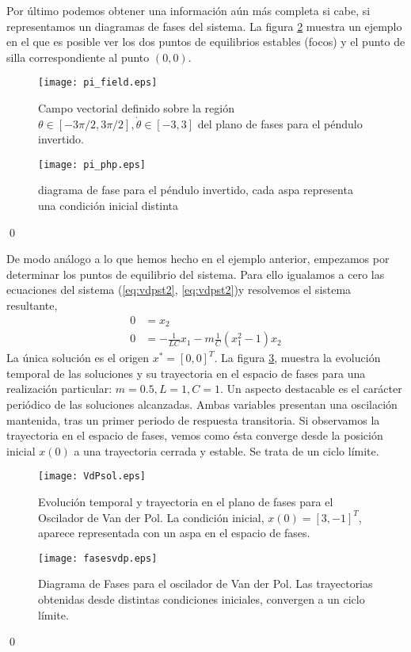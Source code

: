 \begin{example}
Por último podemos obtener una información aún más completa si cabe, si representamos un diagramas de fases del sistema.  La figura \ref{fig:piphp} muestra un ejemplo en el que es posible ver los dos puntos de equilibrios estables (focos) y el punto de silla correspondiente al punto $(0,0)$. 

 
\begin{figure}
\centering
\texttt{[image: pi\_field.eps]}
\caption{Campo vectorial definido sobre la región  $\theta \in [-3\pi/2,3\pi/2], \dot \theta \in [-3,3]$ del plano de fases para el péndulo invertido. } \label{fig:pifield}
\end{figure}

 \begin{figure}
\centering
\texttt{[image: pi\_php.eps]}
\caption{diagrama de fase para el péndulo invertido, cada aspa representa una condición inicial distinta} \label{fig:piphp}
\end{figure}
\qed
\end{example}

\begin{example} De modo análogo a lo que hemos hecho en el ejemplo anterior, empezamos por determinar los puntos de equilibrio del sistema. Para ello igualamos a cero las ecuaciones del sistema (\ref{eq:vdpst2}, \ref{eq:vdpst2})y resolvemos el sistema resultante,
\begin{align}
0 &= x_2\\
0 &= -\frac{1}{LC}x_1 - m\frac{1}{C}(x_1^2-1)x_2 
\end{align}
La única solución es el origen $x^*=[0,0]^T$. La figura \ref{fig:vandesol}, muestra la evolución temporal de las soluciones y su trayectoria en el espacio de fases para una realización particular: $m = 0.5, L=1,C=1$. Un aspecto destacable es el carácter periódico de las soluciones alcanzadas. Ambas variables presentan una oscilación mantenida, tras un primer periodo de respuesta transitoria. Si observamos la trayectoria en el espacio de fases, vemos como ésta converge desde la posición inicial $x(0)$ a una trayectoria cerrada y estable. Se trata de un ciclo límite. 

\begin{figure}
\centering
\texttt{[image: VdPsol.eps]}
\caption{Evolución temporal y trayectoria en el plano de fases para el Oscilador de Van der Pol. La condición inicial, $x(0)=[3,-1]^T$, aparece representada con un aspa en el espacio de fases.} \label{fig:vandesol}
\end{figure}

\begin{figure}
\centering
\texttt{[image: fasesvdp.eps]}
\caption{Diagrama de Fases para el oscilador de Van der Pol. Las trayectorias obtenidas desde distintas condiciones iniciales, convergen a un ciclo límite.} \label{fig:fasesvdp}
\end{figure}
\qed
\end{example}

